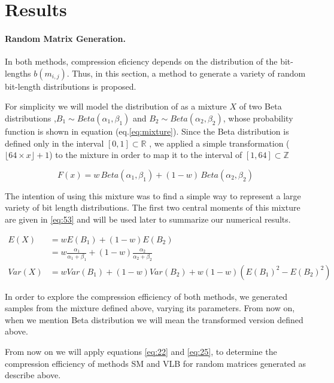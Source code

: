 \documentclass[10pt]{article}
\begin{document}
\section*{Results}

\paragraph{Random Matrix Generation.}
In both methods, compression eficiency depends on the distribution of the bit-lengths $b(m_{i,j})$. Thus, in this section, a method to generate a variety of random bit-length distributions is proposed.

For simplicity we will model the distribution of  as a mixture $X$ of two Beta distributions ,$ B_1 \sim Beta(\alpha_1,\beta_1)$ and $B_2 \sim Beta(\alpha_2,\beta_2)$, whose probability function is shown in equation (eq.\ref{eq:mixture}). Since the Beta distribution is defined only in the interval $[0,1] \subset \mathbb{R}$ , we applied a simple transformation ($\lfloor 64 \times x \rfloor + 1$) to the mixture in order to map it to the interval of $[1,64] \subset \mathbb{Z}$

\begin{equation}\label{eq:mixture}
 F(x) =  w \, Beta(\alpha_1,\beta_1) + (1-w)\,Beta(\alpha_2,\beta_2)
\end{equation}

The intention of using this mixture was to find a simple way to represent a large variety of bit length distributions. The first two central moments of this mixture are given in \ref{eq:53} and will be used later to summarize our numerical results.

\begin{align}\label{eq:53}
 E(X) &= w E(B_1) + (1-w) E(B_2) \nonumber \\
 &= w \frac{\alpha_1}{\alpha_1+\beta_1} + (1-w)\frac{\alpha_2}{\alpha_2+\beta_2}\nonumber \\
 Var(X) &= w Var(B_1) + (1-w) Var(B_2) + w (1-w) (E(B_1)^2 - E(B_2)^2)
\end{align}

In order to explore the compression efficiency of both methods, we generated samples from the mixture defined above, varying its parameters. From now on, when we mention Beta distribution we will mean the transformed version defined above.

From now on we will apply equations \ref{eq:22} and \ref{eq:25}, to determine the compression efficiency of methods SM and VLB for random matrices generated as describe above. 
\end{document}
